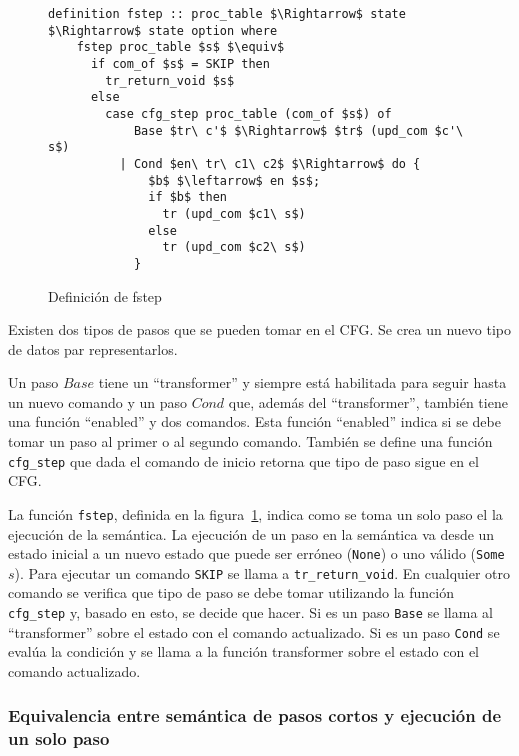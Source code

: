 \begin{figure}
  \begin{lstlisting}[frame=single, mathescape=true]
  definition fstep :: proc_table $\Rightarrow$ state $\Rightarrow$ state option where
    fstep proc_table $s$ $\equiv$
      if com_of $s$ = SKIP then
        tr_return_void $s$
      else
        case cfg_step proc_table (com_of $s$) of
            Base $tr\ c'$ $\Rightarrow$ $tr$ (upd_com $c'\ s$)
          | Cond $en\ tr\ c1\ c2$ $\Rightarrow$ do {
              $b$ $\leftarrow$ en $s$;
              if $b$ then
                tr (upd_com $c1\ s$)
              else  
                tr (upd_com $c2\ s$)
            }
  \end{lstlisting}

  \caption{Definición de fstep}
  \label{fig:fstep_def}
\end{figure}

Existen dos tipos de pasos que se pueden tomar en el CFG.
Se crea un nuevo tipo de datos par representarlos.


Un paso $Base$ tiene un ``transformer'' y siempre está habilitada para seguir hasta un nuevo comando y un paso $Cond$ que, además del ``transformer'', también tiene una función ``enabled'' y dos comandos.
Esta función ``enabled'' indica si se debe tomar un paso al primer o al segundo comando.
También se define una función \verb|cfg_step| que dada el comando de inicio retorna que tipo de paso sigue en el CFG.

La función \verb|fstep|, definida en la figura~\ref{fig:fstep_def}, indica como se toma un solo paso el la ejecución de la semántica.
La ejecución de un paso en la semántica va desde un estado inicial a un nuevo estado que puede ser erróneo (\verb|None|) o uno válido (\verb|Some| $s$).
Para ejecutar un comando \verb|SKIP| se llama a \verb|tr_return_void|.
En cualquier otro comando se verifica que tipo de paso se debe tomar utilizando la función \verb|cfg_step| y, basado en esto, se decide que hacer.
Si es un paso \verb|Base| se llama al ``transformer'' sobre el estado con el comando actualizado.
Si es un paso \verb|Cond| se evalúa la condición y se llama a la función transformer sobre el estado con el comando actualizado.

\subsubsection*{Equivalencia entre semántica de pasos cortos y ejecución de un solo paso}\label{subsubsection:equality_ss_ss}


